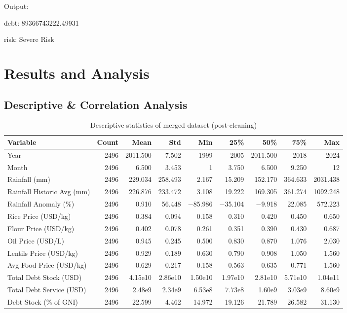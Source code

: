 \documentclass[12pt,a4paper]{article}
\begin{document}
Output:

debt: 89366743222.49931

risk: Severe Risk



\clearpage
\section{Results and Analysis}
\subsection{Descriptive \& Correlation Analysis}
\begin{table}[H]
\centering
\begin{spacing}{1.15}
\caption{Descriptive statistics of merged dataset (post-cleaning)}
\label{tab:descriptive}
\setlength{\tabcolsep}{4pt}
\small
\begin{tabularx}{\textwidth}{Xrrrrrrrr}
\toprule
\textbf{Variable} & \textbf{Count} & \textbf{Mean} & \textbf{Std} & \textbf{Min} & \textbf{25\%} & \textbf{50\%} & \textbf{75\%} & \textbf{Max} \\
\midrule
Year                                & 2496 & 2011.500 & 7.502   & 1999    & 2005   & 2011.500 & 2018   & 2024    \\
Month                               & 2496 & 6.500    & 3.453    & 1       & 3.750  & 6.500    & 9.250  & 12      \\
Rainfall (mm)                       & 2496 & 229.034  & 258.493  & 2.167    & 15.209 & 152.170  & 364.633 & 2031.438 \\
Rainfall Historic Avg (mm)          & 2496 & 226.876  & 233.472  & 3.108    & 19.222 & 169.305  & 361.274 & 1092.248 \\
Rainfall Anomaly (\%)               & 2496 & 0.910    & 56.448   & $-$85.986 & $-$35.104 & $-$9.918 & 22.085 & 572.223 \\
Rice Price (USD/kg)                 & 2496 & 0.384   & 0.094   & 0.158   & 0.310  & 0.420   & 0.450  & 0.650   \\
Flour Price (USD/kg)                & 2496 & 0.402   & 0.078   & 0.261   & 0.351  & 0.390   & 0.430  & 0.687   \\
Oil Price (USD/L)                   & 2496 & 0.945   & 0.245   & 0.500   & 0.830  & 0.870   & 1.076  & 2.030   \\
Lentils Price (USD/kg)              & 2496 & 0.929   & 0.189   & 0.630   & 0.790  & 0.908   & 1.050  & 1.560   \\
Avg Food Price (USD/kg)             & 2496 & 0.629   & 0.217   & 0.158   & 0.563  & 0.635   & 0.771  & 1.560   \\
Total Debt Stock (USD)              & 2496 & 4.15e10  & 2.86e10  & 1.50e10  & 1.97e10 & 2.81e10  & 5.71e10 & 1.04e11 \\
Total Debt Service (USD)            & 2496 & 2.48e9   & 2.34e9   & 6.53e8   & 7.73e8  & 1.60e9   & 3.03e9  & 8.60e9  \\
Debt Stock (\% of GNI)              & 2496 & 22.599   & 4.462    & 14.972   & 19.126 & 21.789   & 26.582  & 31.130  \\
\bottomrule
\end{tabularx}
\end{spacing}
\end{table}
\end{document}
